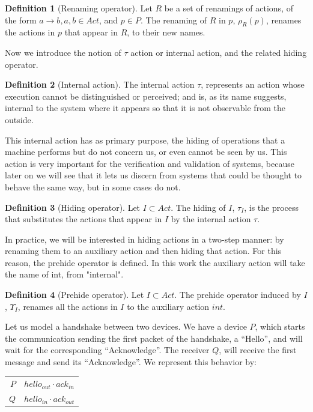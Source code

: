 \documentclass[11pt]{article}
\theoremstyle{definition}
\newtheorem{definition}{Definition}
\theoremstyle{plain}
\theoremstyle{definition}
\begin{document}
\begin{definition} [Renaming operator]
	Let $ R $ be a set of renamings of actions, of the form $ a\rightarrow b, a,b \in Act $, and $ p \in P $. The renaming of $ R $ in $ p $, $ \rho_R(p) $, renames the actions in $ p $ that appear in $ R $, to their new names.
\end{definition}

Now we introduce the notion of $ \tau $ action or internal action, and the related hiding operator.

\begin{definition} [Internal action]
	The internal action $ \tau $, represents an action whose execution cannot be distinguished or perceived; and is, as its name suggests, internal to the system where it appears so that it is not observable from the outside.
\end{definition}
This internal action has as primary purpose, the hiding of operations that a machine performs but do not concern us, or even cannot be seen by us. This action is very important for the verification and validation of systems, because later on we will see that it lets us discern from systems that could be thought to behave the same way, but in some cases do not.
\begin{definition} [Hiding operator]
	Let $ I \subset Act $. The hiding of $ I $, $ \tau_I $, is the process that substitutes the actions that appear in $ I $ by the internal action $ \tau $.
\end{definition}

In practice, we will be interested in hiding actions in a two-step manner: by renaming them to an auxiliary action and then hiding that action. For this reason, the prehide operator is defined. In this work the auxiliary action will take the name of int, from "internal".

\begin{definition} [Prehide operator]
	Let $ I \subset Act $. The prehide operator induced by $ I $, $ \Upsilon_I $, renames all the actions in $ I $ to the auxiliary action $ int $.
\end{definition}

Let us model a handshake between two devices. We have a device $ P $, which starts the communication sending the first packet of the handshake, a ``Hello'', and will wait for the corresponding ``Acknowledge''. The receiver $ Q $, will receive the first message and send its ``Acknowledge''. We represent this behavior by:

\begin{table}[H]
	\centering
	\begin{tabular}{  r@{ = }l  }
		$ P $ & $ hello_{out} · ack_{in}  $ \\
		$ Q $ & $ hello_{in} · ack_{out} $
	\end{tabular}
\end{table}
\end{document}
